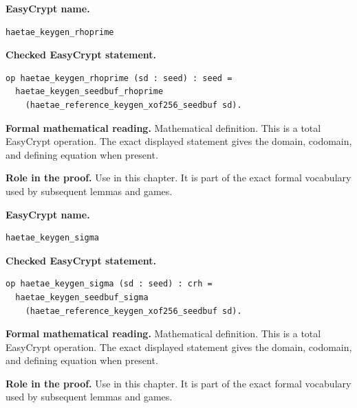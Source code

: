 \begin{formaldefinition}
\noindent\textbf{EasyCrypt name.}
\begin{lstlisting}[language=EasyCrypt,basicstyle=\ttfamily\scriptsize]
haetae_keygen_rhoprime
\end{lstlisting}
\noindent\textbf{Checked EasyCrypt statement.}
\begin{lstlisting}[language=EasyCrypt,basicstyle=\ttfamily\scriptsize]
op haetae_keygen_rhoprime (sd : seed) : seed =
  haetae_keygen_seedbuf_rhoprime
    (haetae_reference_keygen_xof256_seedbuf sd).
\end{lstlisting}
\noindent\textbf{Formal mathematical reading.}
Mathematical definition. This is a total EasyCrypt operation.  The exact displayed statement gives the domain, codomain, and defining equation when present.

\noindent\textbf{Role in the proof.}
Use in this chapter. It is part of the exact formal vocabulary used by subsequent lemmas and games.

\end{formaldefinition}

\begin{formaldefinition}
\noindent\textbf{EasyCrypt name.}
\begin{lstlisting}[language=EasyCrypt,basicstyle=\ttfamily\scriptsize]
haetae_keygen_sigma
\end{lstlisting}
\noindent\textbf{Checked EasyCrypt statement.}
\begin{lstlisting}[language=EasyCrypt,basicstyle=\ttfamily\scriptsize]
op haetae_keygen_sigma (sd : seed) : crh =
  haetae_keygen_seedbuf_sigma
    (haetae_reference_keygen_xof256_seedbuf sd).
\end{lstlisting}
\noindent\textbf{Formal mathematical reading.}
Mathematical definition. This is a total EasyCrypt operation.  The exact displayed statement gives the domain, codomain, and defining equation when present.

\noindent\textbf{Role in the proof.}
Use in this chapter. It is part of the exact formal vocabulary used by subsequent lemmas and games.

\end{formaldefinition}

